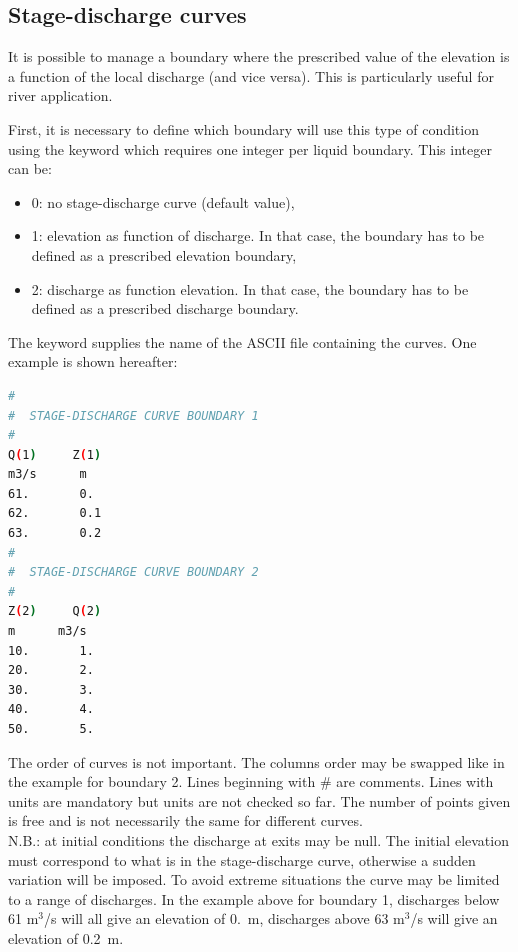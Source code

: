 \subsection{Stage-discharge curves}
\label{subs:stage:dis:curve}
It is possible to manage a boundary where the prescribed value of the elevation
is a function of the local discharge (and vice versa).
This is particularly useful for river application.

First, it is necessary to define which boundary will use this type of condition
using the keyword  which requires one integer per
liquid boundary.
This integer can be:

\begin{itemize}
\item 0: no stage-discharge curve (default value),

\item 1: elevation as function of discharge.
In that case, the boundary has to be defined as a prescribed elevation boundary,

\item 2: discharge as function elevation.
In that case, the boundary has to be defined as a prescribed discharge boundary.
\end{itemize}

The keyword  supplies the name of the ASCII
file containing the curves.
One example is shown hereafter:
\begin{lstlisting}[language=bash]
#
#  STAGE-DISCHARGE CURVE BOUNDARY 1
#
Q(1)     Z(1)
m3/s      m
61.       0.
62.       0.1
63.       0.2
#
#  STAGE-DISCHARGE CURVE BOUNDARY 2
#
Z(2)     Q(2)
m      m3/s
10.       1.
20.       2.
30.       3.
40.       4.
50.       5.
\end{lstlisting}
The order of curves is not important.
The columns order may be swapped like in the example for boundary 2.
Lines beginning with \# are comments.
Lines with units are mandatory but units are not checked so far.
The number of points given is free and is not necessarily the same for different
curves.
\\

N.B.: at initial conditions the discharge at exits may be null.
The initial elevation must correspond to what is in the stage-discharge curve,
otherwise a sudden variation will be imposed.
To avoid extreme situations the curve may be limited to a range of discharges.
In the example above for boundary 1, discharges below 61 m$^3$/s will all give
an elevation of 0.~m, discharges above 63 m$^3$/s will give an elevation of
0.2~m.
\\

